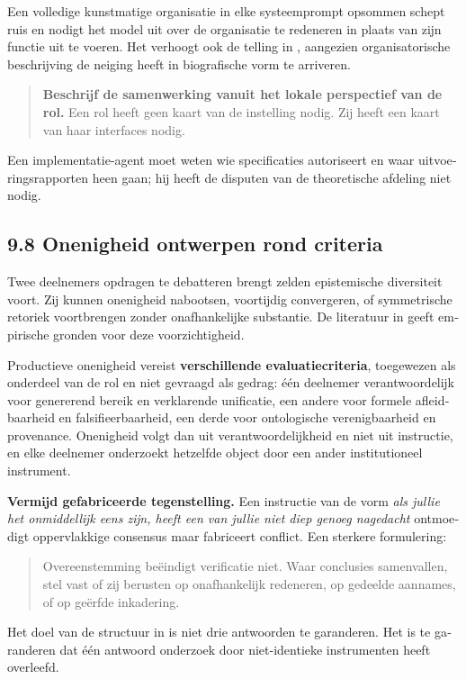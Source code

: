 \begin{dutch}
Een volledige kunstmatige organisatie in elke systeemprompt opsommen schept ruis en nodigt het model uit over de organisatie te redeneren in plaats van zijn functie uit te voeren. Het verhoogt ook de telling in , aangezien organisatorische beschrijving de neiging heeft in biografische vorm te arriveren.

\begin{quote}
\textbf{Beschrijf de samenwerking vanuit het lokale perspectief van de rol.} Een rol heeft geen kaart van de instelling nodig. Zij heeft een kaart van haar interfaces nodig.
\end{quote}
Een implementatie-agent moet weten wie specificaties autoriseert en waar uitvoeringsrapporten heen gaan; hij heeft de disputen van de theoretische afdeling niet nodig.


\subsection*{9.8 Onenigheid ontwerpen rond criteria}
\label{sec:nl:9.8}

Twee deelnemers opdragen te debatteren brengt zelden epistemische diversiteit voort. Zij kunnen onenigheid nabootsen, voortijdig convergeren, of symmetrische retoriek voortbrengen zonder onafhankelijke substantie. De literatuur in  geeft empirische gronden voor deze voorzichtigheid.

Productieve onenigheid vereist \textbf{verschillende evaluatiecriteria}, toegewezen als onderdeel van de rol en niet gevraagd als gedrag: één deelnemer verantwoordelijk voor genererend bereik en verklarende unificatie, een andere voor formele afleidbaarheid en falsifieerbaarheid, een derde voor ontologische verenigbaarheid en provenance. Onenigheid volgt dan uit verantwoordelijkheid en niet uit instructie, en elke deelnemer onderzoekt hetzelfde object door een ander institutioneel instrument.

\textbf{Vermijd gefabriceerde tegenstelling.} Een instructie van de vorm \emph{als jullie het onmiddellijk eens zijn, heeft een van jullie niet diep genoeg nagedacht} ontmoedigt oppervlakkige consensus maar fabriceert conflict. Een sterkere formulering:

\begin{quote}
Overeenstemming beëindigt verificatie niet. Waar conclusies samenvallen, stel vast of zij berusten op onafhankelijk redeneren, op gedeelde aannames, of op geërfde inkadering.
\end{quote}
Het doel van de structuur in  is niet drie antwoorden te garanderen. Het is te garanderen dat één antwoord onderzoek door niet-identieke instrumenten heeft overleefd.



\end{dutch}
